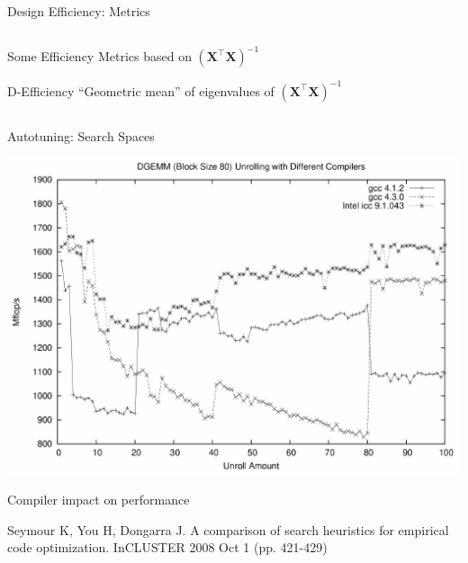 \documentclass[10pt, compress, aspectratio=169, xcolor={table,usenames,dvipsnames}]{beamer}
\begin{document}
\begin{frame}[label={sec:orgbace3c5}]{Design Efficiency: Metrics}
\begin{columns}
\begin{column}{0.5\columnwidth}
\begin{block}{Some Efficiency Metrics based on \(\left(\bm{X}^{\intercal}\bm{X}\right)^{-1}\)}
\begin{block}{D-Efficiency}
\vspace{-.3cm}
\colorbox{Accent!25}{``Geometric mean'' of eigenvalues of \(\left(\bm{X}^{\intercal}\bm{X}\right)^{-1}\)}
\end{block}
\end{block}
\end{column}
\end{columns}
\end{frame}
\begin{frame}[label={sec:org887589d}]{Autotuning: Search Spaces}
\addtocounter{framenumber}{-1}
\begin{center}
\begin{center}
\includegraphics[width=.6\linewidth]{../../../img/seymour2008comparison_compilers.pdf}
\end{center}

\vspace{-.2cm}

\alert{Compiler impact} on performance

\scriptsize{Seymour K, You H, Dongarra J. A comparison of search heuristics for empirical code optimization. InCLUSTER 2008 Oct 1 (pp. 421-429)}
\end{center}
\end{frame}
\end{document}
